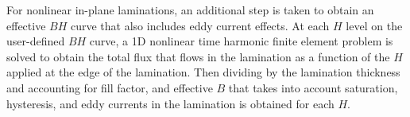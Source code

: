 \documentclass[12pt]{report}
\begin{document}
For nonlinear in-plane laminations, an additional step is taken to
obtain an effective $BH$ curve that also includes eddy current
effects. At each $H$ level on the user-defined $BH$ curve, a 1D
nonlinear time harmonic finite element problem is solved to obtain
the total flux that flows in the lamination as a function of the
$H$ applied at the edge of the lamination. Then dividing by the
lamination thickness and accounting for fill factor, and effective
$B$ that takes into account saturation, hysteresis, and eddy
currents in the lamination is obtained for each $H$.
\end{document}
